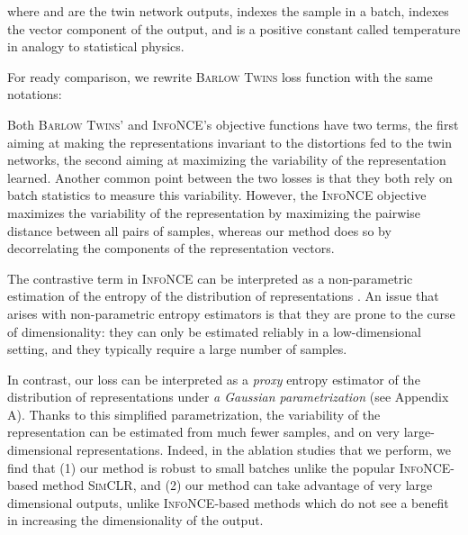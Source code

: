 \documentclass{article}
\newcommand{\AlgoName}{\textsc{Barlow Twins}}
\begin{document}
where  and  are the twin network outputs,  indexes the sample in a batch,  indexes the vector component of the output, and  is a positive constant called temperature in analogy to statistical physics.

For ready comparison, we rewrite \AlgoName{} loss function with the same notations:


Both \AlgoName{}' and \textsc{InfoNCE}'s objective functions have two terms, the first aiming at making the representations invariant to the distortions fed to the twin networks, the second aiming at maximizing the variability of the representation learned.  Another common point between the two losses is that they both rely on batch statistics to measure this variability. However, the \textsc{InfoNCE} objective maximizes the variability of the representation by maximizing the pairwise distance between all pairs of samples, whereas our method does so by decorrelating the components of the representation vectors. 

The contrastive term in \textsc{InfoNCE} can be interpreted as a non-parametric estimation of the entropy of the distribution of representations \cite{wang_understanding_2020}. An issue that arises with non-parametric entropy estimators is that they are prone to the curse of dimensionality: they can only be estimated reliably in a low-dimensional setting, and they typically require a large number of samples. 

In contrast, our loss can be interpreted as a \emph{proxy} entropy estimator of the distribution of representations under \emph{a Gaussian parametrization} (see Appendix A). Thanks to this simplified parametrization, the variability of the representation can be estimated from much fewer samples, and on very large-dimensional representations. Indeed, in the ablation studies that we perform, we find that (1) our method is robust to small batches unlike the popular \textsc{InfoNCE}-based method \textsc{SimCLR}, and (2) our method can take advantage of very large dimensional outputs, unlike \textsc{InfoNCE}-based methods which do not see a benefit in increasing the dimensionality of the output.
\end{document}
